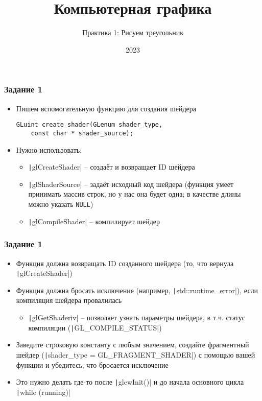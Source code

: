 \documentclass[10pt]{beamer}
\title{Компьютерная графика}
\subtitle{Практика 1: Рисуем треугольник}
\date{2023}
\begin{document}
\frame{\titlepage}

\begin{frame}[fragile]
\frametitle{Задание 1}
\begin{itemize}
\item Пишем вспомогательную функцию для создания шейдера
\begin{verbatim}
GLuint create_shader(GLenum shader_type,
    const char * shader_source);
\end{verbatim}
\item Нужно использовать:
\begin{itemize}
\item \texttt|glCreateShader| -- создаёт и возвращает ID шейдера
\item \texttt|glShaderSource| -- задаёт исходный код шейдера (функция умеет принимать массив строк, но у нас она будет одна; в качестве длины можно указать \verb|NULL|)
\item \texttt|glCompileShader| -- компилирует шейдер
\end{itemize}
\end{itemize}
\end{frame}

\begin{frame}[fragile]
\frametitle{Задание 1}
\begin{itemize}
\item Функция должна возвращать ID созданного шейдера (то, что вернула \texttt|glCreateShader|)
\item Функция должна бросать исключение (например, \texttt|std::runtime_error|), если компиляция шейдера провалилась
\begin{itemize}
\item \texttt|glGetShaderiv| -- позволяет узнать параметры шейдера, в т.ч. статус компиляции (\texttt|GL_COMPILE_STATUS|)
\end{itemize}
\item Заведите строковую константу с любым значением, создайте фрагментный шейдер (\texttt|shader_type = GL_FRAGMENT_SHADER|) с помощью вашей функции и убедитесь, что бросается исключение
\item Это нужно делать где-то после \texttt|glewInit()| и до начала основного цикла \texttt|while (running)|
\end{itemize}
\end{frame}
\end{document}
